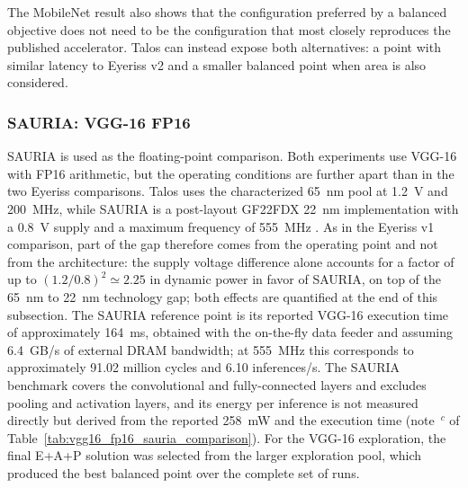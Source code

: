 The MobileNet result also shows that the configuration preferred by a
balanced objective does not need to be the configuration that most
closely reproduces the published accelerator. Talos can instead expose
both alternatives: a point with similar latency to Eyeriss v2 and a
smaller balanced point when area is also considered.

\subsubsection{SAURIA: VGG-16 FP16}
SAURIA is used as the floating-point comparison. Both experiments use
VGG-16 with FP16 arithmetic, but the operating conditions are further
apart than in the two Eyeriss comparisons. Talos uses the characterized
65~nm pool at 1.2~V and 200~MHz, while SAURIA is a post-layout GF22FDX
22~nm implementation with a 0.8~V supply and a maximum frequency of
555~MHz \cite{sauria2023}. As in the Eyeriss v1 comparison, part of the
gap therefore comes from the operating point and not from the
architecture: the supply voltage difference alone accounts for a
factor of up to $(1.2/0.8)^2\simeq2.25$ in dynamic power in favor of
SAURIA, on top of the 65~nm to 22~nm technology gap; both effects are
quantified at the end of this subsection. The SAURIA reference point
is its reported VGG-16 execution time of approximately 164~ms,
obtained with the on-the-fly data feeder and assuming 6.4~GB/s of
external DRAM bandwidth; at 555~MHz this corresponds to approximately
91.02 million cycles and 6.10 inferences/s. The SAURIA benchmark covers
the convolutional and fully-connected layers and excludes pooling and
activation layers, and its energy per inference is not measured
directly but derived from the reported 258~mW and the execution time
(note~$^{c}$ of Table~\ref{tab:vgg16_fp16_sauria_comparison}). For
the VGG-16 exploration, the final E+A+P solution was selected from the
larger exploration pool, which produced the best balanced point over
the complete set of runs.

